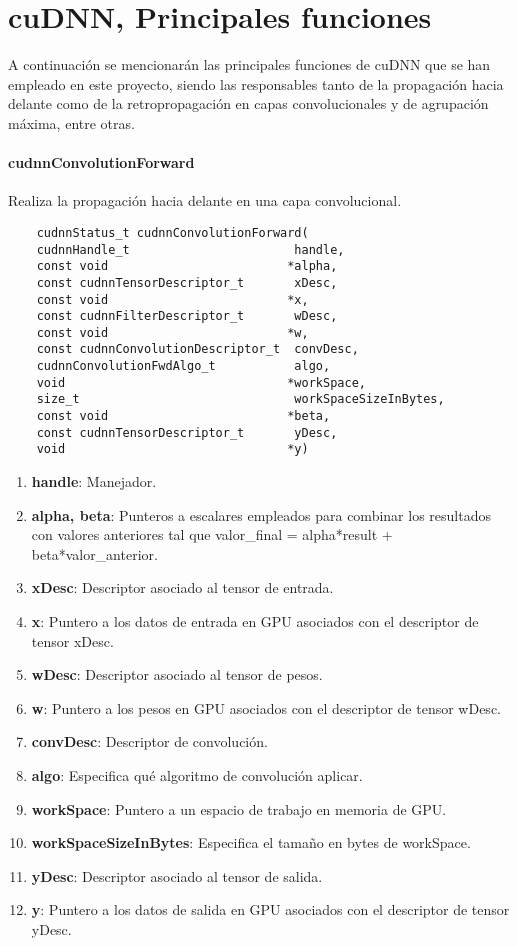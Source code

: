 
\chapter{cuDNN, Principales funciones} \label{apendice_cuDNN_principales_funciones}

A continuación se mencionarán las principales funciones de cuDNN que se han empleado en este proyecto, siendo las responsables tanto de la propagación hacia delante como de la retropropagación en capas convolucionales y de agrupación máxima, entre otras.

\subsubsection{cudnnConvolutionForward} \label{cudnnConvolutionForward}
Realiza la propagación hacia delante en una capa convolucional.

\begin{verbatim}
	cudnnStatus_t cudnnConvolutionForward(
	cudnnHandle_t                       handle,
	const void                         *alpha,
	const cudnnTensorDescriptor_t       xDesc,
	const void                         *x,
	const cudnnFilterDescriptor_t       wDesc,
	const void                         *w,
	const cudnnConvolutionDescriptor_t  convDesc,
	cudnnConvolutionFwdAlgo_t           algo,
	void                               *workSpace,
	size_t                              workSpaceSizeInBytes,
	const void                         *beta,
	const cudnnTensorDescriptor_t       yDesc,
	void                               *y)
\end{verbatim}

\begin{enumerate}
	\item \textbf{handle}: Manejador.
	\item \textbf{alpha, beta}: Punteros a escalares empleados para combinar los resultados con valores anteriores tal que valor\_final = alpha*result + beta*valor\_anterior.
	\item \textbf{xDesc}: Descriptor asociado al tensor de entrada.
	\item \textbf{x}: Puntero a los datos de entrada en GPU asociados con el descriptor de tensor xDesc.
	\item \textbf{wDesc}: Descriptor asociado al tensor de pesos.
	\item \textbf{w}: Puntero a los pesos en GPU asociados con el descriptor de tensor wDesc.
	\item \textbf{convDesc}: Descriptor de convolución.
	\item \textbf{algo}: Especifica qué algoritmo de convolución aplicar.
	\item \textbf{workSpace}: Puntero a un espacio de trabajo en memoria de GPU.
	\item \textbf{workSpaceSizeInBytes}: Especifica el tamaño en bytes de workSpace.
	\item \textbf{yDesc}: Descriptor asociado al tensor de salida.
	\item \textbf{y}: Puntero a los datos de salida en GPU asociados con el descriptor de tensor yDesc.
\end{enumerate}
\cite{cuDNN_conv_fwd}

